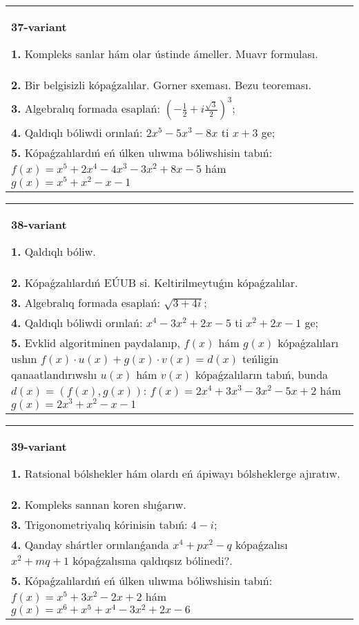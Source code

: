 \documentclass{article}
\begin{document}
\begin{tabular}{m{17cm}}
\textbf{37-variant}
\newline

\textbf{1.} Kompleks sanlar hám olar ústinde ámeller. Muavr formulası.  \\
\textbf{2.} Bir belgisizli kópaǵzalılar. Gorner sxeması. Bezu teoreması.  \\
\textbf{3.} Algebralıq formada esaplań:  $\left(-\frac{1}{2}+i \frac{\sqrt{3}}{2}\right)^3$; \\
\textbf{4.} Qaldıqlı bóliwdi orınlań: $2 x^5-5 x^3-8 x$ ti $x+3$ ge; \\
\textbf{5.} Kópaǵzalılardıń eń úlken ulıwma bóliwshisin tabıń:  $f(x)=x^5+2 x^4-4 x^3-3 x^2+8 x-5$ hám $g(x)=x^5+x^2-x-1$ \\

\end{tabular}
\vspace{1cm}


\begin{tabular}{m{17cm}}
\textbf{38-variant}
\newline

\textbf{1.} Qaldıqlı bóliw.  \\
\textbf{2.} Kópaǵzalılardıń EÚUB si. Keltirilmeytuǵın   kópaǵzalılar. \\
\textbf{3.} Algebralıq formada esaplań:  $\sqrt{3+4 i}$; \\
\textbf{4.} Qaldıqlı bóliwdi orınlań: $x^4-3 x^2+2 x-5$ ti $x^2+2 x-1$ ge; \\
\textbf{5.} Evklid algoritminen paydalanıp, $f(x)$ hám $g(x)$ kópaǵzalıları ushın $f(x) \cdot u(x)+g(x) \cdot v(x)=d(x)$ teńligin qanaatlandırıwshı $u(x)$ hám $v(x)$ kópaǵzalıların tabıń, bunda $d(x)=(f(x), g(x))$:  $f(x)=2 x^4+3 x^3-3 x^2-5 x+2$ hám $g(x)=2 x^3+x^2-x-1$ \\

\end{tabular}
\vspace{1cm}


\begin{tabular}{m{17cm}}
\textbf{39-variant}
\newline

\textbf{1.} Ratsional bólshekler hám olardı eń ápiwayı bólsheklerge ajıratıw. \\
\textbf{2.} Kompleks sannan koren shıǵarıw. \\
\textbf{3.} Trigonometriyalıq kórinisin tabıń: $4-i$; \\
\textbf{4.} Qanday shártler orınlanǵanda $x^4+p x^2-q$ kópaǵzalısı $x^2+m q+1$ kópaǵzalısına qaldıqsız bólinedi?. \\
\textbf{5.} Kópaǵzalılardıń eń úlken ulıwma bóliwshisin tabıń:  $f(x)=x^5+3 x^2-2 x+2$ hám $g(x)=x^6+x^5+x^4-3 x^2+2 x-6$ \\

\end{tabular}
\vspace{1cm}
\end{document}

